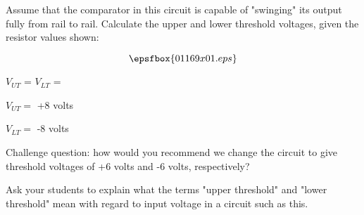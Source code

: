 

Assume that the comparator in this circuit is capable of "swinging" its output fully from rail to rail.  Calculate the upper and lower threshold voltages, given the resistor values shown:

$$\epsfbox{01169x01.eps}$$

$V_{UT}$ = \hskip 80pt $V_{LT}$ = 

\vskip 10pt







$V_{UT} =$ +8 volts

\vskip 10pt

$V_{LT} =$ -8 volts

\vskip 10pt

Challenge question: how would you recommend we change the circuit to give threshold voltages of +6 volts and -6 volts, respectively?







Ask your students to explain what the terms "upper threshold" and "lower threshold" mean with regard to input voltage in a circuit such as this.




